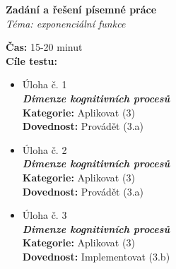 \centering\Large\textbf{Zadání a řešení písemné práce}\\
\centering\normalsize\textit{Téma: exponenciální funkce}

\raggedright
\textbf{Čas:} 15-20 minut\\
\textbf{Cíle testu:}
\noindent
\begin{itemize}[topsep=0pt]
  \item Úloha č. 1\\
        \textbf{\textit{Dimenze kognitivních procesů}}\\
        \textbf{Kategorie:} Aplikovat (3)\\
        \textbf{Dovednost:} Provádět (3.a)
  \item Úloha č. 2\\
        \textbf{\textit{Dimenze kognitivních procesů}}\\
        \textbf{Kategorie:} Aplikovat (3)\\
        \textbf{Dovednost:} Provádět (3.a)
  \item Úloha č. 3\\
        \textbf{\textit{Dimenze kognitivních procesů}}\\
        \textbf{Kategorie:} Aplikovat (3)\\
        \textbf{Dovednost:} Implementovat (3.b)



\end{itemize}
